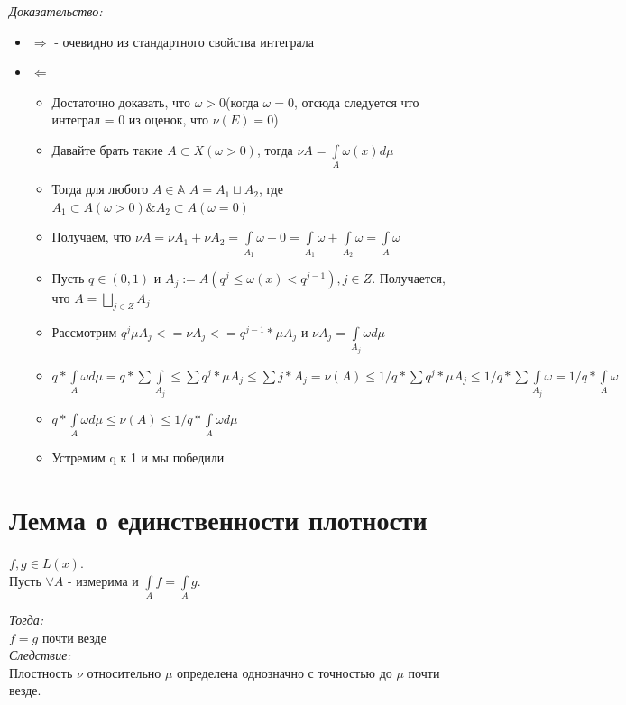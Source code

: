 \documentclass[paper=a4, fontsize=17pt]{article}
\begin{document}
	\emph{Доказательство:}
	 	\begin{itemize}
	 		\item $\Rightarrow$ - очевидно из стандартного свойства интеграла
	 		\item $\Leftarrow$\par
	 		\begin{itemize}
	 			\item
	 			Достаточно доказать, что $\omega > 0$(когда $\omega = 0$, отсюда следуется что интеграл = 0 из оценок, что $\nu(E) = 0$)
	 			\item
	 			Давайте брать такие $A \subset X(\omega > 0)$, тогда $\nu A = \int\limits_A \omega(x) d\mu$
	 			\item
	 			Тогда для любого $A\in\mathbb{A}$ $A = A_1 \sqcup A_2$, где $A_1 \subset A(\omega > 0) \& A_2 \subset A(\omega = 0)$
	 			\item
	 			Получаем, что $\nu A = \nu A_1 + \nu A_2  = \int\limits_{A_1}\omega + 0 = \int\limits_{A_1}\omega + \int\limits_{A_2}\omega = \int\limits_{A}\omega$
	 			\item
	 			Пусть $q\in(0, 1)$ и $A_j:=A(q^j \leq \omega(x) < q^{j - 1}), j \in Z$. Получается, что $A = \bigsqcup_{j \in Z} A_j$
	 			\item
	 			Рассмотрим $q^j \mu A_j <= \nu A_j <= q^{j - 1} * \mu A_j$ и $\nu A_j = \int\limits_{A_j}\omega d\mu$
	 			\item
	 			$q * \int\limits_A \omega d\mu = q * \sum \int\limits_{A_j} \leq \sum q^j * \mu A_j \leq \sum j * A_j = \nu(A) \leq 1 / q * \sum q^j * \mu A_j \leq 1 / q * \sum \int\limits_{A_j} \omega = 1 /q * \int\limits_A \omega$
	 			\item
	 			$q * \int\limits_A \omega d\mu \leq \nu(A) \leq 1 / q * \int\limits_A \omega d\mu$
	 			\item
	 			Устремим q к 1 и мы победили
	 		\end{itemize}
	 	\end{itemize}

\section{Лемма о единственности плотности}
	$f, g \in L(x)$. \\
	Пусть $\forall A$ - измерима и $\int\limits_A f = \int\limits_A g$.

	\emph{Тогда: } \\
		$f = g$ почти везде \\
	\emph{Следствие: } \\
		Плостность $\nu$ относительно $\mu$ определена однозначно с точностью до $\mu$ почти везде.
\end{document}
